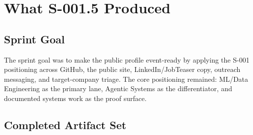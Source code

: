 \documentclass[a4paper,11pt,openany]{report}
\begin{document}


\chapter{What S-001.5 Produced}
\label{ch:s0015}


\section{Sprint Goal}

The sprint goal was to make the public profile event-ready by applying the
S-001 positioning across GitHub, the public site, LinkedIn/JobTeaser copy,
outreach messaging, and target-company triage. The core positioning remained:
ML/Data Engineering as the primary lane, Agentic Systems as the differentiator,
and documented systems work as the proof surface.

\section{Completed Artifact Set}
\end{document}
